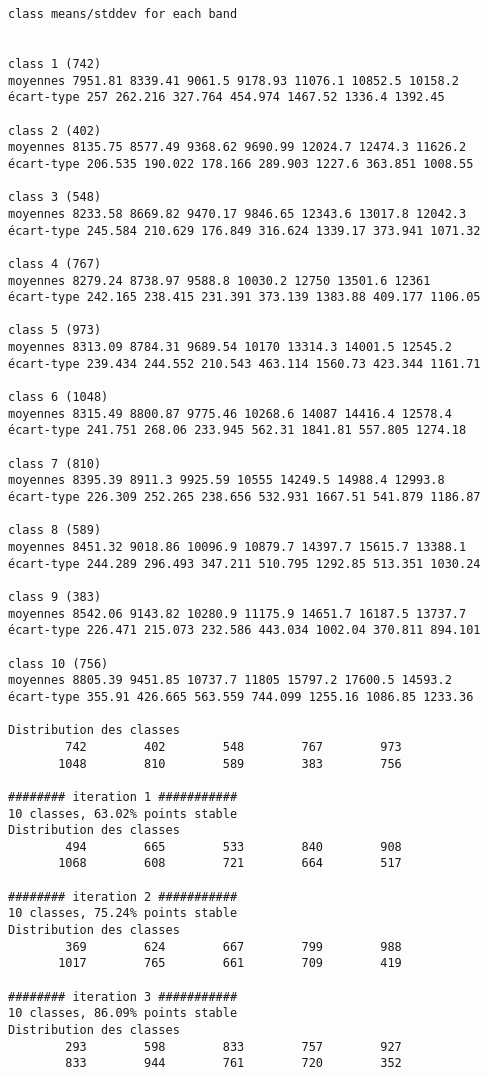 \documentclass[sustainability,article,submit,pdftex,moreauthors]{Definitions/mdpi}
\begin{document}
\begin{footnotesize}
\begin{verbatim}
class means/stddev for each band


class 1 (742)
moyennes 7951.81 8339.41 9061.5 9178.93 11076.1 10852.5 10158.2
écart-type 257 262.216 327.764 454.974 1467.52 1336.4 1392.45

class 2 (402)
moyennes 8135.75 8577.49 9368.62 9690.99 12024.7 12474.3 11626.2
écart-type 206.535 190.022 178.166 289.903 1227.6 363.851 1008.55

class 3 (548)
moyennes 8233.58 8669.82 9470.17 9846.65 12343.6 13017.8 12042.3
écart-type 245.584 210.629 176.849 316.624 1339.17 373.941 1071.32

class 4 (767)
moyennes 8279.24 8738.97 9588.8 10030.2 12750 13501.6 12361
écart-type 242.165 238.415 231.391 373.139 1383.88 409.177 1106.05

class 5 (973)
moyennes 8313.09 8784.31 9689.54 10170 13314.3 14001.5 12545.2
écart-type 239.434 244.552 210.543 463.114 1560.73 423.344 1161.71

class 6 (1048)
moyennes 8315.49 8800.87 9775.46 10268.6 14087 14416.4 12578.4
écart-type 241.751 268.06 233.945 562.31 1841.81 557.805 1274.18

class 7 (810)
moyennes 8395.39 8911.3 9925.59 10555 14249.5 14988.4 12993.8
écart-type 226.309 252.265 238.656 532.931 1667.51 541.879 1186.87

class 8 (589)
moyennes 8451.32 9018.86 10096.9 10879.7 14397.7 15615.7 13388.1
écart-type 244.289 296.493 347.211 510.795 1292.85 513.351 1030.24

class 9 (383)
moyennes 8542.06 9143.82 10280.9 11175.9 14651.7 16187.5 13737.7
écart-type 226.471 215.073 232.586 443.034 1002.04 370.811 894.101

class 10 (756)
moyennes 8805.39 9451.85 10737.7 11805 15797.2 17600.5 14593.2
écart-type 355.91 426.665 563.559 744.099 1255.16 1086.85 1233.36

Distribution des classes
        742        402        548        767        973
       1048        810        589        383        756

######## iteration 1 ###########
10 classes, 63.02% points stable
Distribution des classes
        494        665        533        840        908
       1068        608        721        664        517

######## iteration 2 ###########
10 classes, 75.24% points stable
Distribution des classes
        369        624        667        799        988
       1017        765        661        709        419

######## iteration 3 ###########
10 classes, 86.09% points stable
Distribution des classes
        293        598        833        757        927
        833        944        761        720        352


\end{verbatim}
\end{footnotesize}
\end{document}
